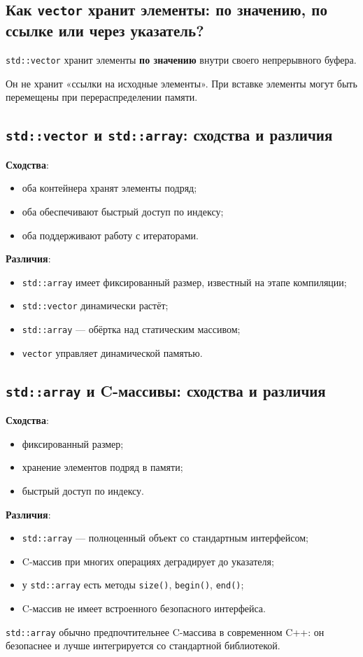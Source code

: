 \subsection{Как \texttt{vector} хранит элементы: по значению, по ссылке или через указатель?}
\texttt{std::vector} хранит элементы \textbf{по значению} внутри своего непрерывного буфера.

\begin{remark}
Он не хранит «ссылки на исходные элементы». При вставке элементы могут быть перемещены при перераспределении памяти.
\end{remark}

\subsection{\texttt{std::vector} и \texttt{std::array}: сходства и различия}
\textbf{Сходства}:
\begin{itemize}
    \item оба контейнера хранят элементы подряд;
    \item оба обеспечивают быстрый доступ по индексу;
    \item оба поддерживают работу с итераторами.
\end{itemize}

\textbf{Различия}:
\begin{itemize}
    \item \texttt{std::array} имеет фиксированный размер, известный на этапе компиляции;
    \item \texttt{std::vector} динамически растёт;
    \item \texttt{std::array} — обёртка над статическим массивом;
    \item \texttt{vector} управляет динамической памятью.
\end{itemize}

\subsection{\texttt{std::array} и C-массивы: сходства и различия}
\textbf{Сходства}:
\begin{itemize}
    \item фиксированный размер;
    \item хранение элементов подряд в памяти;
    \item быстрый доступ по индексу.
\end{itemize}

\textbf{Различия}:
\begin{itemize}
    \item \texttt{std::array} — полноценный объект со стандартным интерфейсом;
    \item C-массив при многих операциях деградирует до указателя;
    \item у \texttt{std::array} есть методы \texttt{size()}, \texttt{begin()}, \texttt{end()};
    \item C-массив не имеет встроенного безопасного интерфейса.
\end{itemize}

\begin{remark}
\texttt{std::array} обычно предпочтительнее C-массива в современном C++: он безопаснее и лучше интегрируется со стандартной библиотекой.
\end{remark}
